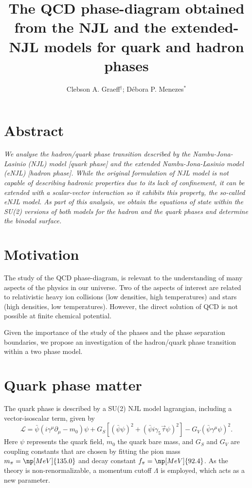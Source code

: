 \documentclass[plainsections,a0]{sciposterlocal}
\title{The QCD phase-diagram obtained from the NJL and the extended-NJL models for quark and hadron phases}
\author{Clebson A. Graeff$^\dagger$; Débora P. Menezes$^*$}
\institute{$^\dagger$~Universidade Tecnológica Federal do Paraná -- Pato Branco, PR - Brazil \\
$^*$~Universidade Federal de Santa Catarina -- Florian\'opolis, SC - Brazil \\
}
\begin{document}
\maketitle %

\begin{multicols}{2} %

\section*{Abstract}
{ \it
We analyse the hadron/quark phase transition described by the Nambu-Jona-Lasinio (NJL) model [quark phase] and the extended Nambu-Jona-Lasinio model (eNJL) [hadron phase]. While the original formulation of NJL model is not capable of describing hadronic properties due to its lack of confinement, it can be extended with a scalar-vector interaction so it exhibits this property, the so-called  eNJL model. As part of this analysis, we obtain the equations of state within the SU(2) versions of both models for the hadron and the quark phases and determine the binodal surface. 
}

\section*{Motivation}

The study of the QCD phase-diagram, is relevant to the understanding of many aspects of the physics in our universe. Two of the aspects of interest are related to relativistic heavy ion collisions (low densities, high temperatures) and stars (high densities, low temperatures). However, the direct solution of QCD is not possible at finite chemical potential.

Given the importance of the study of the phases and the phase separation boundaries, we propose an investigation of the hadron/quark phase transition within a two phase model.

\section*{Quark phase matter}

The quark phase is described by a SU(2) NJL model lagrangian, including a vector-isoscalar term, given by \cite{Buballa2005}
\begin{equation}\label{Eq:LagNJL-SU2-Bub}
	\mathcal{L} =\bar{\psi}(i\gamma^\mu\partial_\mu - m_0)\psi + G_S[(\bar{\psi}\psi)^2 + (\bar{\psi}i\gamma_5\vec{\tau}\psi)^2] - G_V(\bar{\psi}\gamma^\mu \psi)^2.
\end{equation}
%
Here $\psi$ represents the quark field, $m_0$ the quark bare mass, and $G_S$ and $G_V$ are coupling constants that are chosen by fitting the pion mass $m_\pi = \np[MeV]{135.0}$ and decay constant $f_\pi = \np[MeV]{92.4}$. As the theory is non-renormalizable, a momentum cutoff $\Lambda$ is employed, which acts as a new parameter.


\end{multicols}
\end{document}
